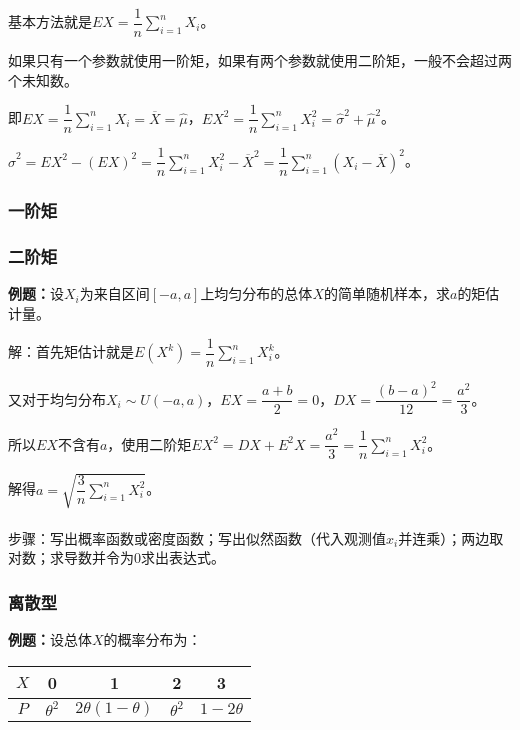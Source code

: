 基本方法就是$EX=\dfrac{1}{n}\sum\limits_{i=1}^nX_i$。

如果只有一个参数就使用一阶矩，如果有两个参数就使用二阶矩，一般不会超过两个未知数。

即$EX=\dfrac{1}{n}\sum\limits_{i=1}^nX_i=\overline{X}=\hat{\mu}$，$EX^2=\dfrac{1}{n}\sum\limits_{i=1}^nX_i^2=\hat{\sigma}^2+\hat{\mu}^2$。

$\hat{\sigma}^2=EX^2-(EX)^2=\dfrac{1}{n}\sum\limits_{i=1}^nX_i^2-\overline{X}^2=\dfrac{1}{n}\sum\limits_{i=1}^n(X_i-\overline{X})^2$。

\subsubsection{一阶矩}

\subsubsection{二阶矩}

\textbf{例题：}设$X_i$为来自区间$[-a,a]$上均匀分布的总体$X$的简单随机样本，求$a$的矩估计量。

解：首先矩估计就是$E(X^k)=\dfrac{1}{n}\sum\limits_{i=1}^nX_i^k$。

又对于均匀分布$X_i\sim U(-a,a)$，$EX=\dfrac{a+b}{2}=0$，$DX=\dfrac{(b-a)^2}{12}=\dfrac{a^2}{3}$。

所以$EX$不含有$a$，使用二阶矩$EX^2=DX+E^2X=\dfrac{a^2}{3}=\dfrac{1}{n}\sum\limits_{i=1}^nX_i^2$。

解得$a=\sqrt{\dfrac{3}{n}\sum\limits_{i=1}^nX_i^2}$。

\paragraph{}

步骤：写出概率函数或密度函数；写出似然函数（代入观测值$x_i$并连乘）；两边取对数；求导数并令为0求出表达式。

\subsubsection{离散型}

\textbf{例题：}设总体$X$的概率分布为：\medskip

\begin{tabular}{c|cccc}
    \hline
    $X$ & 0 & 1 & 2 & 3 \\ \hline
    $P$ & $\theta^2$ & $2\theta(1-\theta)$ & $\theta^2$ & $1-2\theta$ \\ \hline
\end{tabular} \medskip

